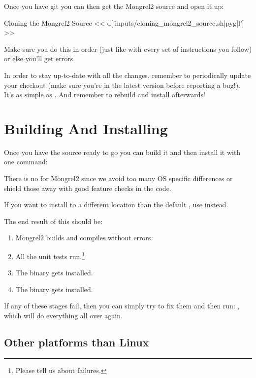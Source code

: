Once you have git you can then get the Mongrel2 source and open it up:

\begin{code}{Cloning the Mongrel2 Source}
<< d['inputs/cloning_mongrel2_source.sh|pyg|l'] >>
\end{code}

Make sure you do this in order (just like with every set of instructions you follow)
or else you'll get errors.

In order to stay up-to-date with all the changes, remember to periodically
update your checkout (make sure you're in the latest version before reporting
a bug!). It's as simple as . And remember to rebuild and install
afterwards!

\section{Building And Installing}

Once you have the source ready to go you can build it and then install it with
one command:  

There is no  for Mongrel2 since we avoid too many OS specific
differences or shield those away with good feature checks in the code.

If you want to install to a different location than the default  ,
use  instead.

The end result of this should be:

\begin{enumerate}
\item Mongrel2 builds and compiles without errors.
\item All the unit tests run.\footnote{Please tell us about failures.}
\item The  binary gets installed.
\item The  binary gets installed.
\end{enumerate}

If any of these stages fail, then you can simply try to fix them and then
run:  , which will do everything all over again.

\subsection{Other platforms than Linux}


